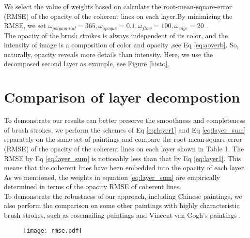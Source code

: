 We select the value of weights based on calculate the root-mean-square-error (RMSE) of the opacity of the coherent lines on each layer.By minimizing the RMSE, we set $\omega_{polynomial}=365, \omega_{opaque}=0.1,\omega_{flow}=100, \omega_{edge}=20 $ . \\
The opacity of the brush strokes is always independent of its color, and the intensity of image is a composition of color and opacity ,see Eq \ref{eq:aoverb}. So, naturally, opacity reveals more details than intensity. Here, we use the decomposed second layer as example, see Figure \ref{histo}. 

\section{Comparison of layer decompostion} \label{comparelayer}
To demonstrate our results can better preserve the smoothness and completeness of brush strokes, we perform the schemes of Eq \ref{eq:layer1} and Eq \ref{eq:layer_sum} separately on the same set of  paintings and compare the root-mean-square-error (RMSE) of the opacity of the coherent lines on each layer shown in Table 1. The RMSE by Eq \ref{eq:layer_sum} is noticeably less than that by Eq \ref{eq:layer1}. This means that the coherent lines have been embedded into the opacity of each layer. As we mentioned, the weights in equation \ref{eq:layer_sum} are empirically determined in terms of the opacity RMSE of coherent lines. \\
To demonstrate the robustness of our approach, including Chinese paintings, we also perform the comparison on some other paintings with highly characteristic brush strokes, such as rosemailing paintings\cite{ellingsgard1978rosemaling} and Vincent van Gogh's paintings\cite{li2012rhythmic} . 

\begin{figure}
	\centering
	\texttt{[image: rmse.pdf]}
	\label{table1}

\end{figure}

















